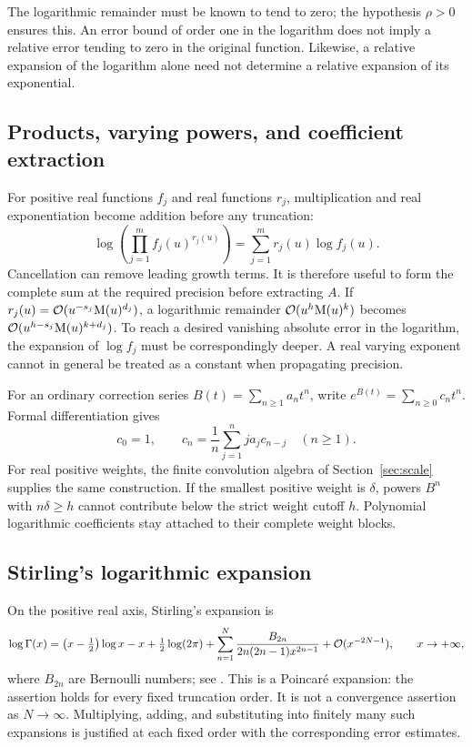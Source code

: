 The logarithmic remainder must be known to tend to zero; the hypothesis
$\rho>0$ ensures this. An error bound of order one in the logarithm
does not imply a relative error tending to zero in the original function. Likewise, a relative expansion of the logarithm
alone need not determine a relative expansion of its exponential.

\subsection{Products, varying powers, and coefficient extraction}

For positive real functions $f_j$ and real functions $r_j$, multiplication
and real exponentiation become addition before any truncation:
\begin{equation}
 \log\left(\prod_{j=1}^m f_j(u)^{r_j(u)}\right)
   =\sum_{j=1}^m r_j(u)\log f_j(u).
 \label{eq:product-logarithms}
\end{equation}
Cancellation can remove leading growth terms. It is therefore useful to
form the complete sum at the required precision before extracting $A$.
If $r_j(u)=\mathcal O(u^{-s_j}\mathrm M(u)^{d_j})$, a logarithmic remainder
$\mathcal O(u^h \mathrm M(u)^k)$ becomes
$\mathcal O(u^{h-s_j}\mathrm M(u)^{k+d_j})$. To reach a desired vanishing absolute
error in the logarithm, the expansion of $\log f_j$ must be correspondingly
deeper. A real varying exponent cannot in general be treated as a constant
when propagating precision.

For an ordinary correction series
$B(t)=\sum_{n\ge1}a_n t^n$, write
$e^{B(t)}=\sum_{n\ge0}c_n t^n$. Formal differentiation gives
\begin{equation}
 c_0=1,\qquad
 c_n=\frac1n\sum_{j=1}^n j a_j c_{n-j}\quad(n\ge1).
 \label{eq:exponential-coefficient-recurrence}
\end{equation}
For real positive weights, the finite convolution algebra of
Section~\ref{sec:scale} supplies the same construction. If the smallest
positive weight is $\delta$, powers $B^n$ with $n\delta\ge h$ cannot
contribute below the strict weight cutoff $h$. Polynomial logarithmic
coefficients stay attached to their complete weight blocks.

\subsection{Stirling's logarithmic expansion}

On the positive real axis, Stirling's expansion is
\begin{equation}
 \log\Gamma(x)=
 \left(x-\tfrac12\right)\log x-x+\tfrac12\log(2\pi)
 +\sum_{n=1}^{N}
   \frac{B_{2n}}{2n(2n-1)x^{2n-1}}
 +\mathcal O(x^{-2N-1}),\qquad x\to+\infty,
 \label{eq:stirling-logarithm}
\end{equation}
where $B_{2n}$ are Bernoulli numbers; see \cite[\S5.11]{dlmf}.
This is a Poincar\'e expansion: the assertion holds for every fixed
truncation order. It is not a convergence assertion as $N\to\infty$.
Multiplying, adding, and substituting into finitely many such expansions
is justified at each fixed order with the corresponding error estimates.

